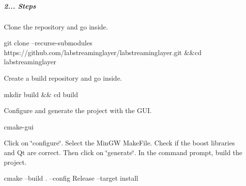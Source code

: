 \subparagraph*{2... Steps}


\begin{DoxyItemize}
\item Clone the repository and go inside. 
\begin{DoxyCode}
git clone --recurse-submodules https://github.com/labstreaminglayer/labstreaminglayer.git &&cd
       labstreaminglayer
\end{DoxyCode}

\item Create a build repository and go inside. 
\begin{DoxyCode}
mkdir build && cd build
\end{DoxyCode}
 Configure and generate the project with the G\+UI. 
\begin{DoxyCode}
cmake-gui
\end{DoxyCode}
 Click on \char`\"{}configure\char`\"{}. Select the Min\+GW Make\+File. Check if the boost libraries and Qt are correct. Then click on \char`\"{}generate\char`\"{}. In the command prompt, build the project. 
\begin{DoxyCode}
cmake --build . --config Release --target install
\end{DoxyCode}
 
\end{DoxyItemize}